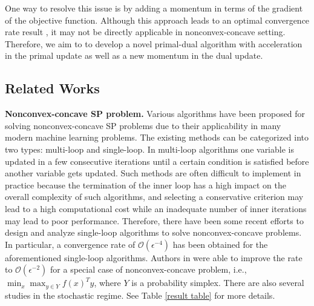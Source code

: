 \documentclass[letterpaper,11 pt]{article}
\def\ml{\mathcal L}
\begin{document}
One way to resolve this issue is by adding a momentum in terms of the gradient of the objective function. Although this approach leads to an optimal convergence rate result \cite{hamedani2021primal,zhao2021accelerated}, it may not be directly applicable in nonconvex-concave setting. Therefore, we aim to to develop a novel primal-dual algorithm with acceleration in the primal update as well as a new momentum in the dual update. 
\subsection{Related Works}
{\bf Nonconvex-concave SP problem.} Various algorithms have been proposed for solving nonconvex-concave SP problems due to their applicability in many modern machine learning problems. The existing methods can be categorized into two types: multi-loop and single-loop. In multi-loop algorithms \cite{kong2021accelerated,ostrovskii2021efficient} one variable is updated in a few consecutive iterations until a certain condition is satisfied before another variable gets updated. Such methods are often difficult to implement in practice because the termination of the inner loop has a high impact on the overall complexity of such algorithms, and selecting a conservative criterion may lead to a high computational cost while an inadequate number of inner iterations may lead to  poor performance. Therefore, there have been some recent efforts \cite{lu2020hybrid,zhang2020single,xu2020unified} to design and analyze single-loop algorithms to solve nonconvex-concave problems. In particular, a convergence rate of $\mathcal O(\epsilon^{-4})$ has been obtained for the aforementioned single-loop algorithms. Authors in \cite{zhang2020single} were able to improve the rate to $\mathcal O(\epsilon^{-2})$ for a special case of nonconvex-concave problem, i.e., $\min_x\max_{y\in Y}f(x)^Ty$, where $Y$ is a probability simplex.
There are also several studies \cite{rafique2018weakly,lin2020gradient,zhang2022sapd} in the stochastic regime. See Table \ref{result table} for more details. 
\end{document}
